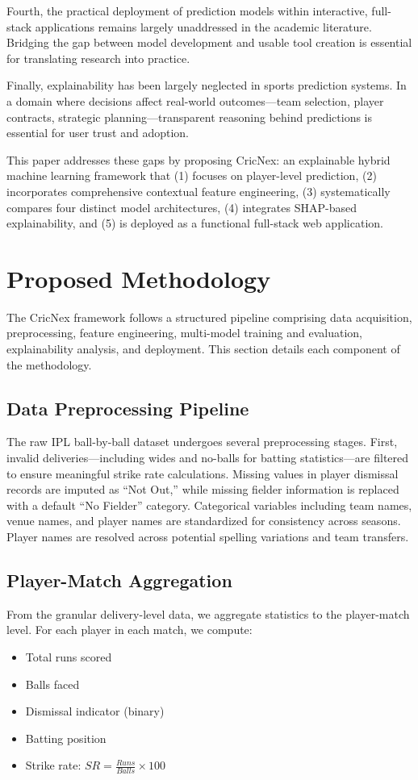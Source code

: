 \documentclass[conference]{IEEEtran}
\begin{document}
Fourth, the practical deployment of prediction models within interactive, full-stack applications remains largely unaddressed in the academic literature. Bridging the gap between model development and usable tool creation is essential for translating research into practice.

Finally, explainability has been largely neglected in sports prediction systems. In a domain where decisions affect real-world outcomes—team selection, player contracts, strategic planning—transparent reasoning behind predictions is essential for user trust and adoption.

This paper addresses these gaps by proposing CricNex: an explainable hybrid machine learning framework that (1) focuses on player-level prediction, (2) incorporates comprehensive contextual feature engineering, (3) systematically compares four distinct model architectures, (4) integrates SHAP-based explainability, and (5) is deployed as a functional full-stack web application.

\section{Proposed Methodology}
The CricNex framework follows a structured pipeline comprising data acquisition, preprocessing, feature engineering, multi-model training and evaluation, explainability analysis, and deployment. This section details each component of the methodology.

\subsection{Data Preprocessing Pipeline}
The raw IPL ball-by-ball dataset undergoes several preprocessing stages. First, invalid deliveries—including wides and no-balls for batting statistics—are filtered to ensure meaningful strike rate calculations. Missing values in player dismissal records are imputed as ``Not Out,'' while missing fielder information is replaced with a default ``No Fielder'' category. Categorical variables including team names, venue names, and player names are standardized for consistency across seasons. Player names are resolved across potential spelling variations and team transfers.

\subsection{Player-Match Aggregation}
From the granular delivery-level data, we aggregate statistics to the player-match level. For each player in each match, we compute:
\begin{itemize}
    \item Total runs scored
    \item Balls faced
    \item Dismissal indicator (binary)
    \item Batting position
    \item Strike rate: \(SR = \frac{Runs}{Balls} \times 100\)
\end{itemize}
\end{document}
